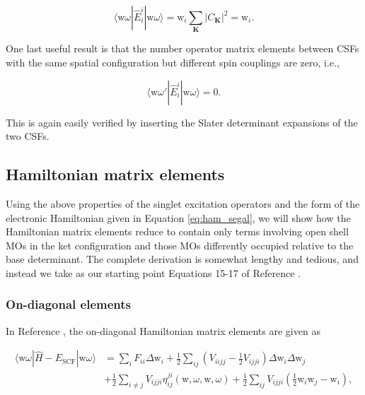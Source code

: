 \documentclass[12pt,a4paper]{report}
\begin{document}
\begin{equation}
  \langle \text{w} \omega | \hat{E}_{i}^{i} | \text{w} \omega \rangle
  = \text{w}_{i} \sum_{\boldsymbol{K}} |C_{\boldsymbol{K}}|^{2} =
  \text{w}_{i}.
\end{equation}

One last useful result is that the number operator matrix elements
between CSFs with the same spatial configuration but different spin
couplings are zero, i.e.,

\begin{equation}
  \langle \text{w} \omega' | \hat{E}_{i}^{i} | \text{w} \omega \rangle
  = 0.
\end{equation}

\noindent
This is again easily verified by
inserting the Slater determinant expansions of the two CSFs.

\subsection{Hamiltonian matrix elements}
Using the above properties of the singlet excitation operators and the
form of the electronic Hamiltonian given in Equation
\ref{eq:ham_segal}, we will show how the Hamiltonian matrix elements
reduce to contain only terms involving open shell MOs in the ket
configuration and those MOs differently occupied relative to the base
determinant. The complete derivation is somewhat lengthy and tedious,
and instead we take as our starting point Equations 15-17 of Reference
.

\subsubsection{On-diagonal elements}
In Reference , the on-diagonal
Hamiltonian matrix elements are given as

\begin{equation}\label{eq:hii_segal}
  \begin{aligned}
    \langle \text{w} \omega | \hat{H} - E_{\text{SCF}} | \text{w}
    \omega \rangle &= \sum_{i} F_{ii} \Delta \text{w}_{i} +
    \frac{1}{2} \sum_{ij} \left( V_{iijj} - \frac{1}{2} V_{ijji}
    \right) \Delta \text{w}_{i} \Delta \text{w}_{j} \\
    &+ \frac{1}{2} \sum_{i \ne j} V_{ijji}
    \eta_{ij}^{ji}(\text{w},\omega,\text{w},\omega) + \frac{1}{2}
    \sum_{ij} V_{ijji} \left( \frac{1}{2} \text{w}_{i} \text{w}_{j} -
    \text{w}_{i} \right),
  \end{aligned}
\end{equation}
\end{document}
